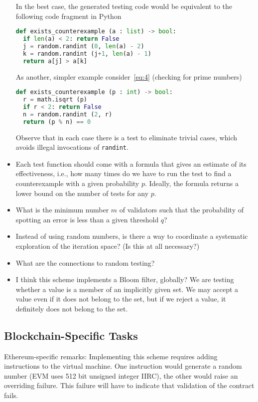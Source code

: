 \documentclass{article}
\newenvironment{ethereum}{%
  \begin{tcolorbox}[breakable,notitle,boxrule=0pt,colback=red!20,colframe=red!20]}{%
  \end{tcolorbox}}
\begin{document}
\begin{itemize}
  In the best case, the generated testing code would be equivalent to the following code fragment
  in Python
\begin{lstlisting}[language=Python]
def exists_counterexample (a : list) -> bool:
  if len(a) < 2: return False
  j = random.randint (0, len(a) - 2)
  k = random.randint (j+1, len(a) - 1)
  return a[j] > a[k]
\end{lstlisting}

  As another, simpler example consider~\eqref{eq:4} (checking for prime numbers)
\begin{lstlisting}[language=Python]
def exists_counterexample (p : int) -> bool:
  r = math.isqrt (p)
  if r < 2: return False
  n = random.randint (2, r)
  return (p % n) == 0
\end{lstlisting}

  Observe that in each case there is a test to eliminate trivial cases, which avoids
  illegal invocations of \lstinline/randint/.
\item Each test function should come with a formula that gives an estimate of
  its effectiveness, i.e., how many times do we have to run the test to find a
  counterexample with a given probability $p$. Ideally, the formula returns a lower
  bound on the number of tests for any $p$.
\item What is the minimum number $m$ of validators such that the probability of
  spotting an error is less than a given threshold $q$?
\item Instead of using random numbers, is there a way to coordinate a systematic
  exploration of the iteration space? (Is this at all necessary?)
\item What are the connections to random testing? 
\item I think this scheme implements a Bloom filter, globally? We are testing whether a value is a
  member of an implicitly given set. We may accept a value even if it does not belong
  to the set, but if we reject a value, it definitely does not belong to the set.
\end{itemize}

\subsection{Blockchain-Specific Tasks}
\label{sec:blockch-spec-tasks}

\begin{ethereum}
  Ethereum-specific remarks:
  Implementing this scheme requires adding instructions to the virtual machine. One
  instruction would generate a random number (EVM uses 512 bit unsigned integer IIRC),
  the other would raise an overriding failure. This failure will have to indicate that
  validation of the contract fails.
\end{ethereum}
\end{document}
